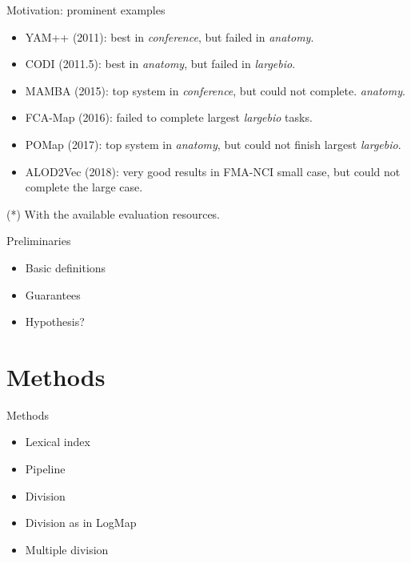 \documentclass[t]{beamer}
\begin{document}
\begin{frame}{Motivation: prominent examples}

  		\begin{itemize}    
  			\item YAM++ (2011): best in \emph{conference}, but failed in \emph{anatomy}.
            \item CODI (2011.5): best in \emph{anatomy}, but failed in \emph{largebio}.
            \item MAMBA (2015): top system in \emph{conference}, but could not complete. \emph{anatomy}.
            \item FCA-Map (2016): failed to complete largest \emph{largebio} tasks.
            \item POMap (2017): top system in \emph{anatomy}, but could not finish\textbf{}
largest \emph{largebio}.
            \item ALOD2Vec (2018): very good results in FMA-NCI small case, but could not complete the large case\textbf{}.
		\end{itemize}
  	
  	(*) With the available evaluation resources.
  	
\end{frame}



\begin{frame}{Preliminaries}
	
  		\begin{itemize}    
  			\item Basic definitions
  			\item Guarantees
  			\item Hypothesis?
		\end{itemize}
  	
\end{frame}


\section{Methods}


\begin{frame}{Methods}
	
  		\begin{itemize}    
  			\item Lexical index
  			\item Pipeline
  			\item Division
  			\item Division as in LogMap
  			\item Multiple division
		\end{itemize}
  	
\end{frame}
\end{document}
